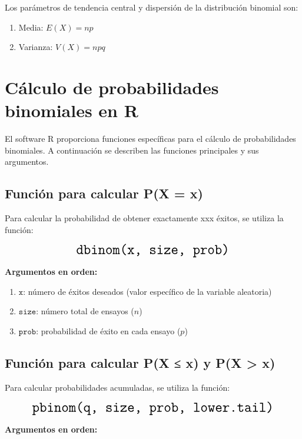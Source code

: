 \documentclass[
  spanish,
  letterpaper,
]{book}
\begin{document}
Los parámetros de tendencia central y dispersión de la distribución
binomial son:

\begin{enumerate}
\def\labelenumi{\arabic{enumi}.}
\item
  Media: \(E(X) = np\)
\item
  Varianza: \(V(X) = npq\)
\end{enumerate}

\section{Cálculo de probabilidades binomiales en
R}\label{cuxe1lculo-de-probabilidades-binomiales-en-r}

El software R proporciona funciones específicas para el cálculo de
probabilidades binomiales. A continuación se describen las funciones
principales y sus argumentos.

\subsection{Función para calcular P(X =
x)}\label{funciuxf3n-para-calcular-px-x}

Para calcular la probabilidad de obtener exactamente xxx éxitos, se
utiliza la función:

\[\LARGE \texttt{dbinom(x, size, prob)} \]

\textbf{Argumentos en orden:}

\begin{enumerate}
\def\labelenumi{\arabic{enumi}.}
\item
  \(\texttt{x}\): número de éxitos deseados (valor específico de la
  variable aleatoria)
\item
  \(\texttt{size}\): número total de ensayos (\(n\))
\item
  \(\texttt{prob}\): probabilidad de éxito en cada ensayo (\(p\))
\end{enumerate}

\subsection{Función para calcular P(X ≤ x) y P(X \textgreater{}
x)}\label{funciuxf3n-para-calcular-px-x-y-px-x}

Para calcular probabilidades acumuladas, se utiliza la función:

\[\LARGE \texttt{pbinom(q, size, prob, lower.tail)}\]

\textbf{Argumentos en orden:}
\end{document}
